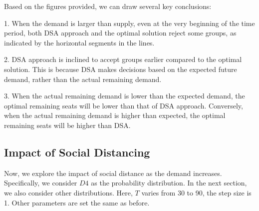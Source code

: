 Based on the figures provided, we can draw several key conclusions:

1. When the demand is larger than supply, even at the very beginning of the time period, both DSA approach and the optimal solution reject some groups, as indicated by the horizontal segments in the lines.

2. DSA approach is inclined to accept groups earlier compared to the optimal solution. This is because DSA makes decisions based on the expected future demand, rather than the actual remaining demand.

3. When the actual remaining demand is lower than the expected demand, the optimal remaining seats will be lower than that of DSA approach. Conversely, when the actual remaining demand is higher than expected, the optimal remaining seats will be higher than DSA.


\subsection{Impact of Social Distancing}
Now, we explore the impact of social distance as the demand increases. Specifically, we consider $D4$ as the probability distribution. In the next section, we also consider other distributions. Here, $T$ varies from 30 to 90, the step size is 1. Other parameters are set the same as before.


